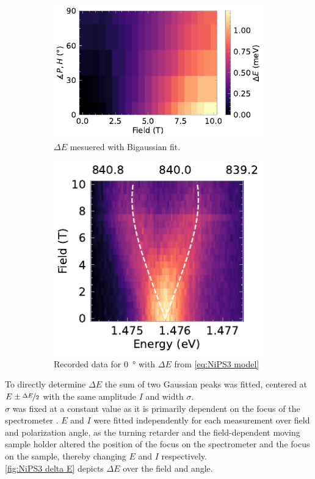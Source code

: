 \documentclass[
	oneside,
	parskip=half,
	a4paper,
]{scrbook}
\begin{document}
\begin{figure}
	\begin{subfigure}[t]{3.5in}
		\includegraphics{../figures/2024-04-21 NiPS3 DeltaE.pdf}
		\caption{$\Delta E$ mesuered with Bigaussian fit.}
		\label{fig:NiPS3 delta E}
	\end{subfigure}
	\begin{subfigure}[t]{2.5in}
		\includegraphics{../figures/2024-04-21 NiPS3 single polarisation.pdf}
		\caption{Recorded data for \SI{0}{\degree} with $\Delta E$ from \autoref{eq:NiPS3 model} }
		\label{fig:NiPS3 model}
	\end{subfigure}
	\caption{}
\end{figure}
To directly determine $\Delta E$ the sum of two Gaussian peaks was fitted, centered at $E\pm \nicefrac{\Delta E}{2}$ with the same amplitude $I$ and width $\sigma$.\\
$\sigma$ was fixed at a constant value as it is primarily dependent on the focus of the spectrometer \autocite{NiPS3_magnon_gap}.
$E$ and $I$ were fitted independently for each measurement over field and polarization angle, as the turning retarder and the field-dependent moving sample holder altered the position of the focus on the spectrometer and the focus on the sample, thereby changing $E$ and $I$ respectively.\\
\autoref{fig:NiPS3 delta E} depicts $\Delta E$ over the field and angle.
\end{document}
